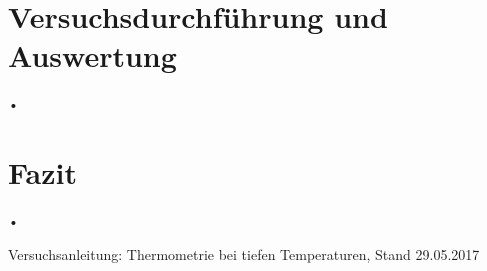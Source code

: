 \documentclass[twoside,colorback,accentcolor=tud4c,11pt]{tudreport}
\begin{document}
\chapter{Versuchsdurchführung und Auswertung}
•
\chapter{Fazit}	
•
\renewcommand{\bibname}{Literatur}
\begin{thebibliography}{0}
 Versuchsanleitung: Thermometrie bei tiefen Temperaturen, Stand 29.05.2017

\end{thebibliography}
\end{document}
